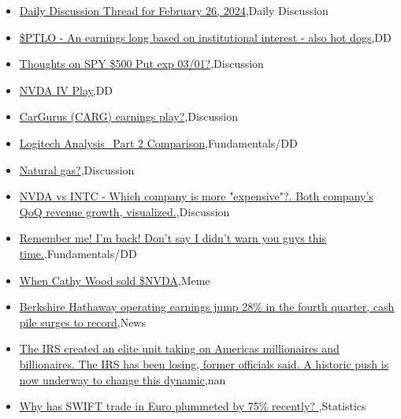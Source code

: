 \documentclass{article}%
\begin{document}
%
\begin{itemize}%
\item%
\href{https://reddit.com/r/wallstreetbets/comments/1b0eutx/daily\_discussion\_thread\_for\_february\_26\_2024/}{Daily Discussion Thread for February 26, 2024},Daily Discussion%
\item%
\href{https://reddit.com/r/wallstreetbets/comments/1b0aalo/ptlo\_an\_earnings\_long\_based\_on\_institutional/}{\$PTLO - An earnings long based on institutional interest - also hot dogs},DD%
\item%
\href{https://reddit.com/r/wallstreetbets/comments/1b09fqg/thoughts\_on\_spy\_500\_put\_exp\_0301/}{Thoughts on SPY \$500 Put exp 03/01?},Discussion%
\item%
\href{https://reddit.com/r/wallstreetbets/comments/1b08xkp/nvda\_iv\_play/}{NVDA IV Play},DD%
\item%
\href{https://reddit.com/r/wallstreetbets/comments/1b06w5h/cargurus\_carg\_earnings\_play/}{CarGurus (CARG) earnings play?},Discussion%
\item%
\href{https://reddit.com/r/StockMarket/comments/1b0cxvg/logitech\_analysis\_part\_2\_comparison/}{Logitech Analysis\_Part 2 Comparison},Fundamentals/DD%
\item%
\href{https://reddit.com/r/StockMarket/comments/1b0b7ez/natural\_gas/}{Natural gas?},Discussion%
\item%
\href{https://reddit.com/r/StockMarket/comments/1azr25h/nvda\_vs\_intc\_which\_company\_is\_more\_expensive\_both/}{NVDA vs INTC - Which company is more "expensive"?. Both company's QoQ revenue growth, visualized.},Discussion%
\item%
\href{https://reddit.com/r/StockMarket/comments/1azn8z9/remember\_me\_im\_back\_dont\_say\_i\_didnt\_warn\_you/}{Remember me! I'm back! Don't say I didn't warn you guys this time.},Fundamentals/DD%
\item%
\href{https://reddit.com/r/StockMarket/comments/1az1s63/when\_cathy\_wood\_sold\_nvda/}{When Cathy Wood sold \$NVDA},Meme%
\item%
\href{https://reddit.com/r/StockMarket/comments/1ayve94/berkshire\_hathaway\_operating\_earnings\_jump\_28\_in/}{Berkshire Hathaway operating earnings jump 28\% in the fourth quarter, cash pile surges to record},News%
\item%
\href{https://reddit.com/r/Economics/comments/1azy6s1/the\_irs\_created\_an\_elite\_unit\_taking\_on\_americas/}{The IRS created an elite unit taking on Americas millionaires and billionaires. The IRS has been losing, former officials said. A historic push is now underway to change this dynamic},nan%
\item%
\href{https://reddit.com/r/Economics/comments/1azrdfp/why\_has\_swift\_trade\_in\_euro\_plummeted\_by\_75/}{Why has SWIFT trade in Euro plummeted by 75\% recently? },Statistics%
\end{itemize}%
\end{document}
